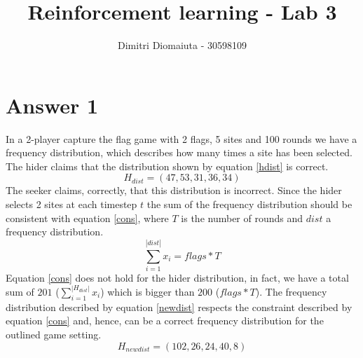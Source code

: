 \documentclass[runningheads]{llncs}
\begin{document}
%
\title{Reinforcement learning - Lab 3}
%
%
\author{Dimitri Diomaiuta - 30598109}
%
%
%
\maketitle              %
%
%
%
%

\section{Answer 1}
In a 2-player capture the flag game with 2 flags, 5 sites and 100
rounds we have a frequency distribution, which describes how many
times a site has been selected. The hider claims that the distribution
shown by equation \ref{hdist} is correct.
\begin{equation}\label{hdist}
H_{dist} = (47, 53, 31, 36, 34)
\end{equation}
The seeker claims, correctly, that this distribution is
incorrect. Since the hider selects 2 sites at each timestep $t$ the
sum of the frequency distribution should be consistent with equation
\ref{cons}, where $T$ is the number of rounds and $dist$ a frequency distribution.
\begin{equation}\label{cons}
  \sum_{i = 1}^{|dist|}x_i = flags * T
\end{equation}
Equation \ref{cons} does not hold for the hider distribution, in fact,
we have a total sum of $201$ ($\sum_{i=1}^{|H_{dist}|}x_i$)
which is bigger than $200$ ($flags * T$). The frequency distribution
described by equation \ref{newdist} respects the constraint described
by equation \ref{cons} and, hence, can be a correct frequency
distribution for the outlined game setting.
\begin{equation}\label{newdist}
  H_{newdist} = (102, 26, 24, 40, 8)
\end{equation}
\end{document}
